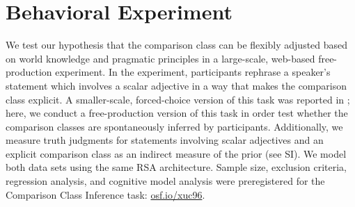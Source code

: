 \documentclass[doc]{apa6}
\newcommand{\mht}[1]{\textcolor{Blue}{[mht: #1]}}
\begin{document}
\section{Behavioral Experiment}


We test our hypothesis that the comparison class can be flexibly adjusted based on world knowledge and pragmatic principles in a large-scale, web-based free-production experiment.
In the experiment, participants rephrase a speaker's statement which involves a scalar adjective in a way that makes the comparison class explicit.
A smaller-scale, forced-choice version of this task was reported in ; here, we conduct a free-production version of this task in order test whether the comparison classes are spontaneously inferred by participants.
Additionally, we measure truth judgments for statements involving scalar adjectives and an explicit comparison class as an indirect measure of the prior (see SI).
We model both data sets using the same RSA architecture.
Sample size, exclusion criteria, regression analysis, and cognitive model analysis were preregistered for the Comparison Class Inference task: \url{osf.io/xuc96}.




 



%
%
%
\end{document}
